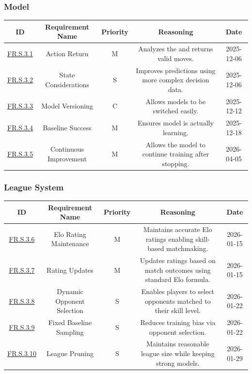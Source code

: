 \documentclass{article}
\begin{document}
\subsubsection*{\AI{} Model}

\begin{tabular}{|c|c|c|c|c|}
\hline
\textbf{ID} & \textbf{Requirement Name} & \textbf{Priority} &
\textbf{Reasoning} & \textbf{Date} \\
\hline
\hyperref[FR.S.3.1]{FR.S.3.1} & Action Return & M &
\parbox[t]{4cm}{Analyzes the \GameState{} and returns valid moves.} &
2025-12-06 \\
\hline
\hyperref[FR.S.3.2]{FR.S.3.2} & State Considerations & S &
\parbox[t]{4cm}{Improves predictions using more complex decision data.} &
2025-12-06 \\
\hline
\hyperref[FR.S.3.3]{FR.S.3.3} & Model Versioning & C &
\parbox[t]{4cm}{Allows models to be switched easily.} &
2025-12-12 \\
\hline
\hyperref[FR.S.3.4]{FR.S.3.4} & Baseline Success & M &
\parbox[t]{4cm}{Ensures model is actually learning.} &
2025-12-18 \\
\hline
\hyperref[FR.S.3.5]{FR.S.3.5} & Continuous Improvement & M &
\parbox[t]{4cm}{Allows the model to continue training after stopping.} &
2026-04-05 \\
\hline
\end{tabular}

\vspace{1em}

\subsubsection*{\Elo{} League System}

\begin{tabular}{|c|c|c|c|c|}
\hline
\textbf{ID} & \textbf{Requirement Name} & \textbf{Priority} &
\textbf{Reasoning} & \textbf{Date} \\
\hline
\hyperref[FR.S.3.6]{FR.S.3.6} & Elo Rating Maintenance & M &
\parbox[t]{4cm}{Maintains accurate Elo ratings enabling skill-based matchmaking.} &
2026-01-15 \\
\hline
\hyperref[FR.S.3.7]{FR.S.3.7} & Rating Updates & M &
\parbox[t]{4cm}{Updates ratings based on match outcomes using standard Elo formula.} &
2026-01-15 \\
\hline
\hyperref[FR.S.3.8]{FR.S.3.8} & Dynamic Opponent Selection & S &
\parbox[t]{4cm}{Enables players to select opponents matched to their skill level.} &
2026-01-22 \\
\hline
\hyperref[FR.S.3.9]{FR.S.3.9} & Fixed Baseline Sampling & S &
\parbox[t]{4cm}{Reduces training bias via opponent selection.} &
2026-01-22 \\
\hline
\hyperref[FR.S.3.10]{FR.S.3.10} & League Pruning & S &
\parbox[t]{4cm}{Maintains reasonable league size while keeping strong models.} &
2026-01-29 \\
\hline
\end{tabular}
\end{document}
